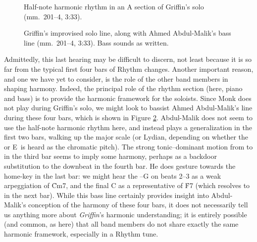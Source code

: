 \begin{figure}[tbp]
  \caption[Half-note harmonic rhythm in an A section of Griffin's solo.]{%
    Half-note harmonic rhythm in an A section of Griffin's solo (mm.~201--4,
    3:33).}
  \label{ran:jg-change-running}
\end{figure}

\begin{figure}[tbp]
  \caption[Griffin's improvised solo line, along with Ahmed Abdul-Malik's bass
  line.]{Griffin's improvised solo line, along with Ahmed Abdul-Malik's bass line
    (mm.~201--4, 3:33). Bass sounds as written.}
  \label{ran:change-running-bass}
\end{figure}

Admittedly, this last hearing may be difficult to discern, not least because
it is so far from the typical first four bars of Rhythm changes. Another
important reason, and one we have yet to consider, is the role of the other
band members in shaping harmony. Indeed, the principal role of the rhythm
section (here, piano and bass) is to provide the harmonic framework for the
soloists. Since Monk does not play during Griffin's solo, we might look to
bassist Ahmed Abdul-Malik's line during these four bars, which is shown in
Figure \ref{ran:change-running-bass}. Abdul-Malik does not seem to use the
half-note harmonic rhythm here, and instead plays a generalization in the
first two bars, walking up the \Bflat major scale (or Lydian, depending on
whether the \Eflat or E\nat\ is heard as the chromatic pitch). The strong
tonic--dominant motion from \Aflat to \Eflat in the third bar seems to imply
some \Aflat harmony, perhaps as a backdoor substitution to the downbeat \Bflat
in the fourth bar. He does gesture towards the home-key \tf in the last bar:
we might hear the \Bflat--G on beats 2--3 as a weak arpeggiation of \h{Cm7},
and the final C as a representative of \h{F7} (which resolves to \Bflat in the
next bar). While this bass line certainly provides insight into Abdul-Malik's
conception of the harmony of these four bars, it does not necessarily tell us
anything more about \emph{Griffin}'s harmonic understanding; it is entirely
possible (and common, as here) that all band members do not share exactly the
same harmonic framework, especially in a Rhythm tune.

